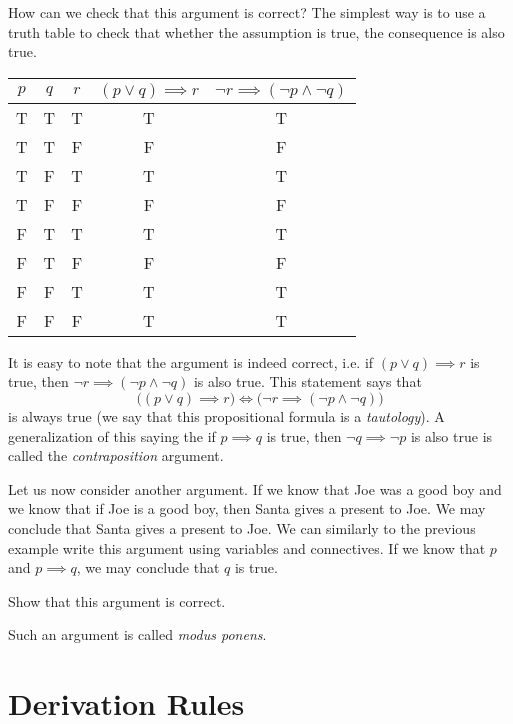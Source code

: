How can we check that this argument is correct? The simplest way is to use a
truth table to check that whether the assumption is true, the consequence is
also true.
\begin{center}
  \begin{tabular}{c | c | c | c | c}
    $p$ & $q$ & $r$ & $(p \lor q) \implies r$ &
      $\lnot r \implies (\lnot p \land \lnot q)$ \\
    \hline
    T & T & T & T & T \\
    T & T & F & F & F \\
    T & F & T & T & T \\
    T & F & F & F & F \\
    F & T & T & T & T \\
    F & T & F & F & F \\
    F & F & T & T & T \\
    F & F & F & T & T
  \end{tabular}
\end{center}
It is easy to note that the argument is indeed correct, i.e.
if $(p \lor q) \implies r$ is true, then
$\lnot r \implies (\lnot p \land \lnot q)$ is also true.
This statement says that
\[
  \bigl((p \lor q) \implies r\bigr) \iff
  \bigl(\lnot r \implies (\lnot p \land \lnot q) \bigr)
\]
is always true (we say that this propositional formula is a
\textit{tautology}). A generalization of this saying the if $p \implies q$ is
true, then $\lnot q \implies \lnot p$ is also true is called the
\textit{contraposition} argument.

Let us now consider another argument. If we know that Joe was a good boy and we
know that if Joe is a good boy, then Santa gives a present to Joe. We may
conclude that Santa gives a present to Joe. We can similarly to the previous
example write this argument using variables and connectives.
If we know that $p$ and $p \implies q$, we may conclude that $q$ is true.
\begin{exercise}
  Show that this argument is correct.
\end{exercise}
Such an argument is called \textit{modus ponens}.

\section{Derivation Rules}


